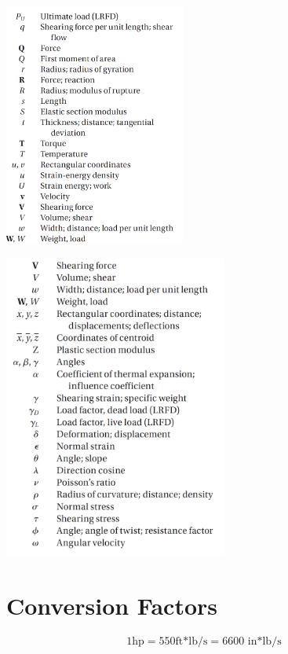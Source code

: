 \documentclass[10pt,landscape]{article}
\newenvironment{Figure}
     {\par\medskip\noindent\minipage{\linewidth}}
     {\endminipage\par\medskip}
\begin{document}
\begin{multicols}{3}
\begin{Figure}
\end{Figure}
\begin{Figure}
    \centering
    \includegraphics[width=\linewidth, height=8cm]{ListOfSymbols_Part_3.png}
\end{Figure}
\begin{Figure}
    \centering
    \includegraphics[width=\linewidth, height=10cm]{ListOfSymbols_Part_4.png}
\end{Figure}

\section{Conversion Factors}
\begin{equation}
    1\text{hp}=550\text{ft*lb/s}=6600\text{ in*lb/s}
\end{equation}


\end{multicols}
\end{document}
